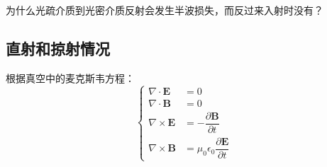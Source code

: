 
为什么光疏介质到光密介质反射会发生半波损失，而反过来入射时没有？

\subsection{直射和掠射情况}
根据真空中的麦克斯韦方程：
\begin{equation}
\begin{cases}
\nabla\cdot \boldsymbol{E}&=0\\
\nabla\cdot \boldsymbol{B}&=0\\
\nabla\times  \boldsymbol{E}&=-\dfrac{\partial \boldsymbol{B}}{\partial t} \\
\nabla\times  \boldsymbol{B}&=\mu_0\epsilon_0\dfrac{\partial \boldsymbol{E}}{\partial t} 
\end{cases}
\end{equation}